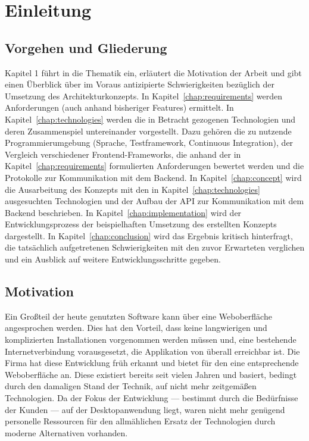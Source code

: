 \chapter{Einleitung}\label{chap:introduction}

\section{Vorgehen und Gliederung}
Kapitel 1 führt in die Thematik ein, erläutert die Motivation der Arbeit und gibt einen Überblick über im Voraus antizipierte Schwierigkeiten bezüglich der Umsetzung des Architekturkonzepts.
In Kapitel~\ref{chap:requirements} werden Anforderungen (auch anhand bisheriger Features) ermittelt.
In Kapitel~\ref{chap:technologies} werden die in Betracht gezogenen Technologien und deren Zusammenspiel untereinander vorgestellt. Dazu gehören die zu nutzende Programmierumgebung (Sprache, Testframework, Continuous Integration), der Vergleich verschiedener Frontend-Frameworks, die anhand der in Kapitel~\ref{chap:requirements} formulierten Anforderungen bewertet werden und die Protokolle zur Kommunikation mit dem Backend.
In Kapitel~\ref{chap:concept} wird die Ausarbeitung des Konzepts mit den in Kapitel~\ref{chap:technologies} ausgesuchten Technologien und der Aufbau der API zur Kommunikation mit dem Backend beschrieben.
In Kapitel~\ref{chap:implementation} wird der Entwicklungsprozess der beispielhaften Umsetzung des erstellten Konzepts dargestellt.
In Kapitel~\ref{chap:conclusion} wird das Ergebnis kritisch hinterfragt, die tatsächlich aufgetretenen Schwierigkeiten mit den zuvor Erwarteten verglichen und ein Ausblick auf weitere Entwicklungsschritte gegeben.

\section{Motivation}
Ein Großteil der heute genutzten Software kann über eine Weboberfläche angesprochen werden. Dies hat den Vorteil, dass keine langwierigen und komplizierten Installationen vorgenommen werden müssen und, eine bestehende Internetverbindung vorausgesetzt, die Applikation von überall erreichbar ist. Die Firma  hat diese Entwicklung früh erkannt und bietet für den  eine entsprechende Weboberfläche an. Diese existiert bereits seit vielen Jahren und basiert, bedingt durch den damaligen Stand der Technik, auf nicht mehr zeitgemäßen Technologien. Da der Fokus der Entwicklung --- bestimmt durch die Bedürfnisse der Kunden --- auf der Desktopanwendung liegt, waren nicht mehr genügend personelle Ressourcen für den allmählichen Ersatz der Technologien durch moderne Alternativen vorhanden.

